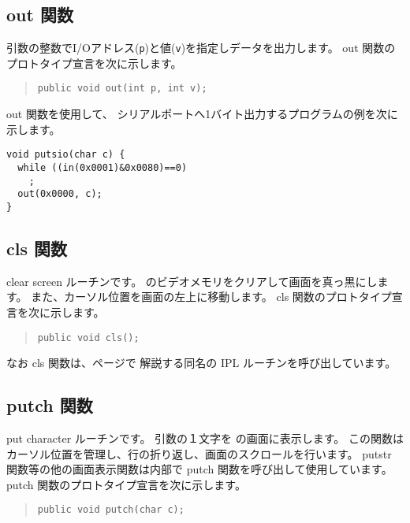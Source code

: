 \subsection{out 関数}

引数の整数でI/Oアドレス(\verb/p/)と値(\verb/v/)を指定しデータを出力します。
out 関数のプロトタイプ宣言を次に示します。

\begin{quote}
\begin{verbatim}
public void out(int p, int v);
\end{verbatim}
\end{quote}

out 関数を使用して、
シリアルポートへ1バイト出力するプログラムの例を次に示します。

\begin{mylist}
\begin{verbatim}
void putsio(char c) {
  while ((in(0x0001)&0x0080)==0)
    ;
  out(0x0000, c);
}
\end{verbatim}
\end{mylist}

\subsection{cls 関数}
clear screen ルーチンです。
\tac のビデオメモリをクリアして画面を真っ黒にします。
また、カーソル位置を画面の左上に移動します。
cls 関数のプロトタイプ宣言を次に示します。

\begin{quote}
\begin{verbatim}
public void cls();
\end{verbatim}
\end{quote}

なお cls 関数は、\pageref{app:ipl}ページで
解説する同名の IPL ルーチンを呼び出しています。

\subsection{putch 関数}

put character ルーチンです。
引数の１文字を \tac の画面に表示します。
この関数はカーソル位置を管理し、行の折り返し、画面のスクロールを行います。
putstr 関数等の他の画面表示関数は内部で putch 関数を呼び出して使用しています。
putch 関数のプロトタイプ宣言を次に示します。

\begin{quote}
\begin{verbatim}
public void putch(char c);
\end{verbatim}
\end{quote}


